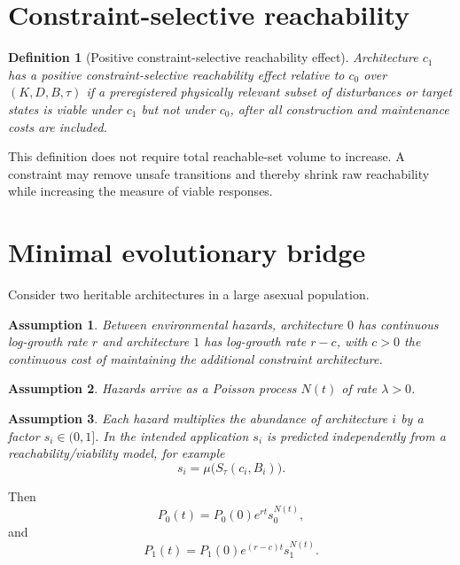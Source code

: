 \documentclass[11pt]{article}
\newtheorem{definition}{Definition}
\newtheorem{assumption}{Assumption}
\begin{document}
\section{Constraint-selective reachability}

\begin{definition}[Positive constraint-selective reachability effect]
Architecture $c_1$ has a positive constraint-selective reachability effect relative to $c_0$ over $(K,D,B,\tau)$ if a preregistered physically relevant subset of disturbances or target states is viable under $c_1$ but not under $c_0$, after all construction and maintenance costs are included.
\end{definition}

This definition does not require total reachable-set volume to increase. A constraint may remove unsafe transitions and thereby shrink raw reachability while increasing the measure of viable responses.

\section{Minimal evolutionary bridge}

Consider two heritable architectures in a large asexual population.

\begin{assumption}
Between environmental hazards, architecture $0$ has continuous log-growth rate $r$ and architecture $1$ has log-growth rate $r-c$, with $c>0$ the continuous cost of maintaining the additional constraint architecture.
\end{assumption}

\begin{assumption}
Hazards arrive as a Poisson process $N(t)$ of rate $\lambda>0$.
\end{assumption}

\begin{assumption}
Each hazard multiplies the abundance of architecture $i$ by a factor $s_i\in(0,1]$. In the intended application $s_i$ is predicted independently from a reachability/viability model, for example
\begin{equation}
    s_i=\mu\bigl(S_\tau(c_i,B_i)\bigr).
\end{equation}
\end{assumption}

Then
\begin{equation}
    P_0(t)=P_0(0)e^{rt}s_0^{N(t)},
\end{equation}
and
\begin{equation}
    P_1(t)=P_1(0)e^{(r-c)t}s_1^{N(t)}.
\end{equation}
\end{document}
